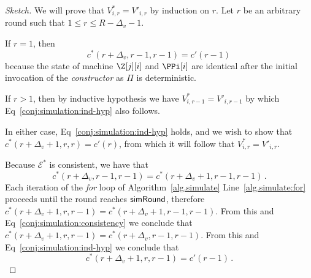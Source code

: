 \begin{proof}[Sketch]
  We will prove that $V^*_{i,r} = V'_{i,r}$ by induction on $r$.
  Let $r$ be an arbitrary round such that $1 \leq r \leq R - \Delta_v - 1$.

  If $r = 1$, then
  \begin{equation}\label{conj:simulation:ind-hyp}
    c^*(r + \Delta_v, r - 1, r - 1) = c'(r - 1)\,
  \end{equation}
  because the state of machine $\Z[j][i]$ and $\PPi[i]$ are identical
  after the initial invocation of the \emph{constructor} as $\Pi$
  is deterministic.

  If $r > 1$, then by inductive hypothesis we have $V^*_{i,r - 1} = V'_{i,r - 1}$
  by which Eq~\ref{conj:simulation:ind-hyp} also follows.

  In either case, Eq~\ref{conj:simulation:ind-hyp} holds, and we
  wish to show that $c^*(r + \Delta_v + 1, r, r) = c'(r)$,
  from which it will follow that $V^*_{i,r} = V'_{i,r}$.

  Because $\mathcal{E}^*$ is consistent, we have that
  \begin{equation}\label{conj:simulation:consistency}
    c^*(r + \Delta_v, r - 1, r - 1) = c^*(r + \Delta_v + 1, r - 1, r - 1)\,.
  \end{equation}
  Each iteration of the \emph{for} loop of Algorithm~\ref{alg.simulate} Line~\ref{alg.simulate:for}
  proceeds until the round reaches $\textsf{simRound}$, therefore
  $c^*(r + \Delta_v + 1, r, r - 1) = c^*(r + \Delta_v + 1, r - 1, r - 1)$.
  From this and Eq~\ref{conj:simulation:consistency} we conclude that
  $c^*(r + \Delta_v + 1, r, r - 1) = c^*(r + \Delta_v, r - 1, r - 1)$.
  From this and Eq~\ref{conj:simulation:ind-hyp} we conclude that
  \begin{equation}\label{conj:simulation:pre-state}
    c^*(r + \Delta_v + 1, r, r - 1) = c'(r - 1)\,.
  \end{equation}


\end{proof}
